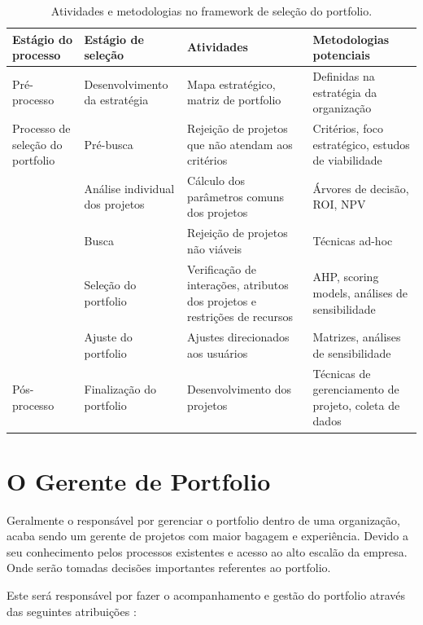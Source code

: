 \documentclass[12pt,a4paper,ruledheader,tocpage=prefix,floatnumber=continuous,pagestart=folhaderosto,font=times]{abnt}
\begin{document}
\begin{table}[H]
\begin{center}
 \begin{tabular}{| >{\centering\arraybackslash\small}m{1.4in} | >{\centering\arraybackslash\small}m{1.3in} | >{\centering\arraybackslash\small}m{1.5in} | >{\centering\arraybackslash\small}m{1in} |}
  \hline
  \rowcolor[rgb]{0.8,0.8,0.8} Estágio do processo & Estágio de seleção & Atividades & Metodologias potenciais \\
  \hline
   Pré-processo & Desenvolvimento da estratégia & Mapa estratégico, matriz de portfolio & Definidas na estratégia da organização \\
  \hline
  Processo de seleção do portfolio & Pré-busca & Rejeição de projetos que não atendam aos critérios & Critérios, foco estratégico, estudos de viabilidade \\
  \cline{2-4} 
	  & Análise individual dos projetos & Cálculo dos parâmetros comuns dos projetos  & Árvores de decisão, ROI, NPV \\
  \cline{2-4} 
	  & Busca & Rejeição de projetos não viáveis & Técnicas ad-hoc \\
  \cline{2-4} 
         & Seleção do portfolio & Verificação de interações, atributos dos projetos e restrições de recursos & AHP, scoring models, análises de sensibilidade \\
  \cline{2-4} 
	& Ajuste do portfolio & Ajustes direcionados aos usuários & Matrizes, análises de sensibilidade\\
  \hline
  Pós-processo & Finalização do portfolio & Desenvolvimento dos projetos & Técnicas de gerenciamento de projeto, coleta de dados \\
  \hline
 \end{tabular}
\caption{Atividades e metodologias no framework de seleção do portfolio\cite{ARCHER1999}.}
\end{center}
\end{table}

\section{O Gerente de Portfolio}
Geralmente o responsável por gerenciar o portfolio dentro de uma organização, acaba sendo um gerente de projetos com maior bagagem e experiência. Devido a
seu conhecimento pelos processos existentes e acesso ao alto escalão da empresa. Onde serão tomadas decisões importantes referentes ao portfolio.

Este será responsável por fazer o acompanhamento e gestão do portfolio através das seguintes atribuições \cite{SPPM2008}:
\end{document}
